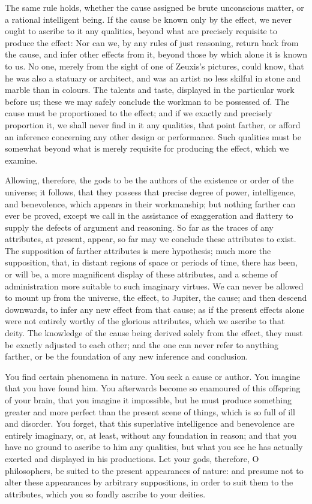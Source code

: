\documentclass[]{article}
\begin{document}
\begin{sectionbody}
\humeparagraph  The same rule holds, whether the cause assigned be brute unconscious matter, or a rational intelligent being. If the cause be known only by the effect, we never ought to ascribe to it any qualities, beyond what are precisely requisite to produce the effect: Nor can we, by any rules of just reasoning, return back from the cause, and infer other effects from it, beyond those by which alone it is known to us. No one, merely from the sight of one of Zeuxis's pictures, could know, that he was also a statuary or architect, and was an artist no less skilful in stone and marble than in colours. The talents and taste, displayed in the particular work before us; these we may safely conclude the workman to be possessed of. The cause must be proportioned to the effect; and if we exactly and precisely proportion it, we shall never find in it any qualities, that point farther, or afford an inference concerning any other design or performance. Such qualities must be somewhat beyond what is merely requisite for producing the effect, which we examine.

\humeparagraph  Allowing, therefore, the gods to be the authors of the existence or order of the universe; it follows, that they possess that precise degree of power, intelligence, and benevolence, which appears in their workmanship; but nothing farther can ever be proved, except we call in the assistance of exaggeration and flattery to supply the defects of argument and reasoning. So far as the traces of any attributes, at present, appear, so far may we conclude these attributes to exist. The supposition of farther attributes is mere hypothesis; much more the supposition, that, in distant regions of space or periods of time, there has been, or will be, a more magnificent display of these attributes, and a scheme of administration more suitable to such imaginary virtues. We can never be allowed to mount up from the universe, the effect, to Jupiter, the cause; and then descend downwards, to infer any new effect from that cause; as if the present effects alone were not entirely worthy of the glorious attributes, which we ascribe to that deity. The knowledge of the cause being derived solely from the effect, they must be exactly adjusted to each other; and the one can never refer to anything farther, or be the foundation of any new inference and conclusion.

\humeparagraph  You find certain phenomena in nature. You seek a cause or author. You imagine that you have found him. You afterwards become so enamoured of this offspring of your brain, that you imagine it impossible, but he must produce something greater and more perfect than the present scene of things, which is so full of ill and disorder. You forget, that this superlative intelligence and benevolence are entirely imaginary, or, at least, without any foundation in reason; and that you have no ground to ascribe to him any qualities, but what you see he has actually exerted and displayed in his productions. Let your gods, therefore, O philosophers, be suited to the present appearances of nature: and presume not to alter these appearances by arbitrary suppositions, in order to suit them to the attributes, which you so fondly ascribe to your deities.


\end{sectionbody}
\end{document}
